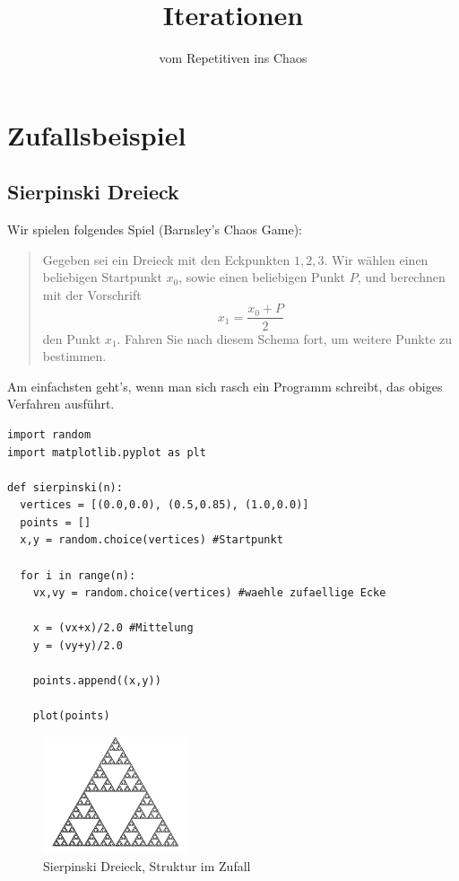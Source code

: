 \documentclass[%
11pt,%
twoside,%
titlepage,%
german,%
headsepline%
]{scrartcl}
\title{Iterationen}
\subtitle{vom Repetitiven ins Chaos}
\author{}
\date{}
\begin{document}
\maketitle
\tableofcontents
\cleardoublepage

\section{\glqq Zufallsbeispiel\grqq}

\subsection{Sierpinski Dreieck}

Wir spielen folgendes Spiel (Barnsley's Chaos Game):
\begin{quote}
Gegeben sei ein Dreieck mit den Eckpunkten $1,2,3$. Wir w\"ahlen einen beliebigen Startpunkt $x_0$, sowie einen beliebigen Punkt $P$, und berechnen mit der Vorschrift
$$x_1=\frac{x_0+P}{2}$$
den Punkt $x_1$. Fahren Sie nach diesem Schema fort, um weitere Punkte zu bestimmen.
\end{quote}
Am einfachsten geht's, wenn man sich rasch ein Programm schreibt, das obiges Verfahren ausführt.

\begin{lstlisting}
import random
import matplotlib.pyplot as plt

def sierpinski(n):
  vertices = [(0.0,0.0), (0.5,0.85), (1.0,0.0)]
  points = []
  x,y = random.choice(vertices) #Startpunkt
  
  for i in range(n):
    vx,vy = random.choice(vertices) #waehle zufaellige Ecke
    
    x = (vx+x)/2.0 #Mittelung
    y = (vy+y)/2.0
    
    points.append((x,y))
    
    plot(points)
\end{lstlisting}

\begin{figure}[h!]
  \centering
\includegraphics[width=0.382\textwidth]{pictures/sierpinski}
\caption{Sierpinski Dreieck, Struktur im Zufall}
\end{figure}
\end{document}
